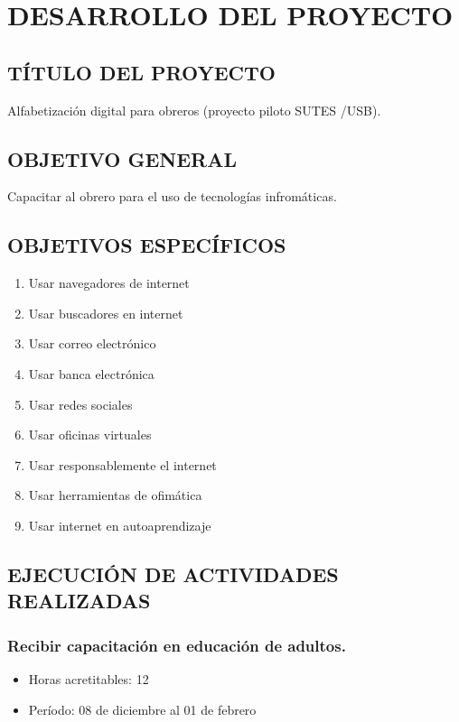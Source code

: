 	\section{DESARROLLO DEL PROYECTO}

        \subsection{TÍTULO DEL PROYECTO}
            Alfabetización digital para obreros (proyecto piloto SUTES /USB).
            
        \subsection{OBJETIVO GENERAL}
            Capacitar al obrero para el uso de tecnologías infromáticas.
            
        \subsection{OBJETIVOS ESPECÍFICOS}
            \begin{enumerate}
                \item Usar navegadores de internet
                \item Usar buscadores en internet
                \item Usar correo electrónico
                \item Usar banca electrónica
                \item Usar redes sociales
                \item Usar oficinas virtuales
                \item Usar responsablemente el internet
                \item Usar herramientas de ofimática
                \item Usar internet en autoaprendizaje
            \end{enumerate}
            
        \subsection{EJECUCIÓN DE ACTIVIDADES REALIZADAS}

             \subsubsection {Recibir capacitación en educación de adultos.}
             \begin{itemize}
                 \item Horas acretitables: 12
                 \item Período: 08 de diciembre al 01 de febrero
                \end{itemize}
             
